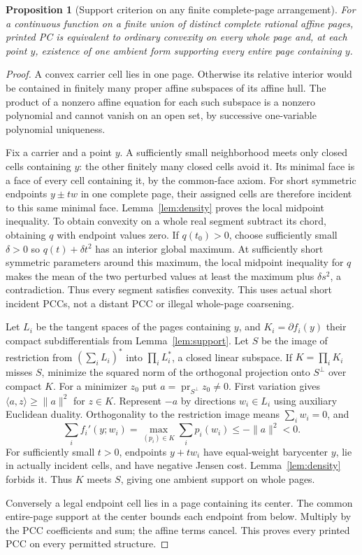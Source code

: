 \documentclass[11pt]{article}
\newtheorem{proposition}[theorem]{Proposition}
\begin{document}
\begin{proposition}[Support criterion on any finite complete-page arrangement]\label{prop:criterion}
For a continuous function on a finite union of distinct complete rational affine pages, printed PC is equivalent to ordinary convexity on every whole page and, at each point $y$, existence of one ambient form supporting every entire page containing $y$.
\end{proposition}
\begin{proof}
A convex carrier cell lies in one page. Otherwise its relative interior would be contained in finitely many proper affine subspaces of its affine hull. The product of a nonzero affine equation for each such subspace is a nonzero polynomial and cannot vanish on an open set, by successive one-variable polynomial uniqueness.

Fix a carrier and a point $y$. A sufficiently small neighborhood meets only closed cells containing $y$: the other finitely many closed cells avoid it. Its minimal face is a face of every cell containing it, by the common-face axiom. For short symmetric endpoints $y\pm tw$ in one complete page, their assigned cells are therefore incident to this same minimal face. Lemma~\ref{lem:density} proves the local midpoint inequality. To obtain convexity on a whole real segment subtract its chord, obtaining $q$ with endpoint values zero. If $q(t_0)>0$, choose sufficiently small $\delta>0$ so $q(t)+\delta t^2$ has an interior global maximum. At sufficiently short symmetric parameters around this maximum, the local midpoint inequality for $q$ makes the mean of the two perturbed values at least the maximum plus $\delta s^2$, a contradiction. Thus every segment satisfies convexity. This uses actual short incident PCCs, not a distant PCC or illegal whole-page coarsening.

Let $L_i$ be the tangent spaces of the pages containing $y$, and $K_i=\partial f_i(y)$ their compact subdifferentials from Lemma~\ref{lem:support}. Let $S$ be the image of restriction from $(\sum_iL_i)^*$ into $\prod_iL_i^*$, a closed linear subspace. If $K=\prod_iK_i$ misses $S$, minimize the squared norm of the orthogonal projection onto $S^\perp$ over compact $K$. For a minimizer $z_0$ put $a=\operatorname{pr}_{S^\perp}z_0\ne0$. First variation gives $\langle a,z\rangle\geq\|a\|^2$ for $z\in K$. Represent $-a$ by directions $w_i\in L_i$ using auxiliary Euclidean duality. Orthogonality to the restriction image means $\sum_iw_i=0$, and
\[
\sum_i f_i'(y;w_i)=\max_{(p_i)\in K}\sum_i p_i(w_i)\leq-\|a\|^2<0.
\]
For sufficiently small $t>0$, endpoints $y+tw_i$ have equal-weight barycenter $y$, lie in actually incident cells, and have negative Jensen cost. Lemma~\ref{lem:density} forbids it. Thus $K$ meets $S$, giving one ambient support on whole pages.

Conversely a legal endpoint cell lies in a page containing its center. The common entire-page support at the center bounds each endpoint from below. Multiply by the PCC coefficients and sum; the affine terms cancel. This proves every printed PCC on every permitted structure.
\end{proof}
\end{document}
